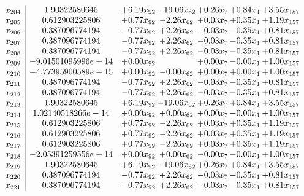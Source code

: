 \documentclass[8pt]{article}
\begin{document}
\[\begin{array}{c| c c@{\hskip 2pt} c@{\hskip 2pt} c@{\hskip 2pt} c@{\hskip 2pt} c@{\hskip 2pt} }
 x_{204}   &  1.90322580645 & +  6.19 x_{92} & -19.06 x_{62} & +  0.26 x_{7} & +  0.84 x_{1} & +  3.55 x_{157}\\
 x_{205}   &  0.612903225806 & +  0.77 x_{92} & -2.26 x_{62} & +  0.03 x_{7} & +  0.35 x_{1} & +  1.19 x_{157}\\
 x_{206}   &  0.387096774194 & -0.77 x_{92} & +  2.26 x_{62} & -0.03 x_{7} & -0.35 x_{1} & +  0.81 x_{157}\\
 x_{207}   &  0.387096774194 & -0.77 x_{92} & +  2.26 x_{62} & -0.03 x_{7} & -0.35 x_{1} & +  0.81 x_{157}\\
 x_{208}   &  0.387096774194 & -0.77 x_{92} & +  2.26 x_{62} & -0.03 x_{7} & -0.35 x_{1} & +  0.81 x_{157}\\
 x_{209}   &  -9.01501095996e-14 & +  0.00 x_{92} &   & +  0.00 x_{7} & -0.00 x_{1} & +  1.00 x_{157}\\
 x_{210}   &  -4.77395900589e-15 & +  0.00 x_{92} & -0.00 x_{62} & +  0.00 x_{7} & +  0.00 x_{1} & +  1.00 x_{157}\\
 x_{211}   &  0.387096774194 & -0.77 x_{92} & +  2.26 x_{62} & -0.03 x_{7} & -0.35 x_{1} & +  0.81 x_{157}\\
 x_{212}   &  0.387096774194 & -0.77 x_{92} & +  2.26 x_{62} & -0.03 x_{7} & -0.35 x_{1} & +  0.81 x_{157}\\
 x_{213}   &  1.90322580645 & +  6.19 x_{92} & -19.06 x_{62} & +  0.26 x_{7} & +  0.84 x_{1} & +  3.55 x_{157}\\
 x_{214}   &  1.02140518266e-14 & +  0.00 x_{92} & +  0.00 x_{62} & +  0.00 x_{7} & -0.00 x_{1} & +  1.00 x_{157}\\
 x_{215}   &  0.612903225806 & +  0.77 x_{92} & -2.26 x_{62} & +  0.03 x_{7} & +  0.35 x_{1} & +  1.19 x_{157}\\
 x_{216}   &  0.612903225806 & +  0.77 x_{92} & -2.26 x_{62} & +  0.03 x_{7} & +  0.35 x_{1} & +  1.19 x_{157}\\
 x_{217}   &  0.612903225806 & +  0.77 x_{92} & -2.26 x_{62} & +  0.03 x_{7} & +  0.35 x_{1} & +  1.19 x_{157}\\
 x_{218}   &  -2.05391259556e-14 & +  0.00 x_{92} & +  0.00 x_{62} & -0.00 x_{7} & -0.00 x_{1} & +  1.00 x_{157}\\
 x_{219}   &  1.90322580645 & +  6.19 x_{92} & -19.06 x_{62} & +  0.26 x_{7} & +  0.84 x_{1} & +  3.55 x_{157}\\
 x_{220}   &  0.387096774194 & -0.77 x_{92} & +  2.26 x_{62} & -0.03 x_{7} & -0.35 x_{1} & +  0.81 x_{157}\\
 x_{221}   &  0.387096774194 & -0.77 x_{92} & +  2.26 x_{62} & -0.03 x_{7} & -0.35 x_{1} & +  0.81 x_{157}\\

\end{array}\]
\end{document}
